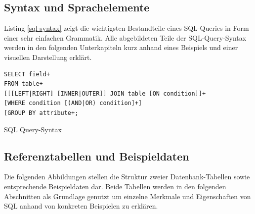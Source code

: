 \documentclass[a4paper]{article}
\begin{document}
\subsection{Syntax und Sprachelemente}
Listing \ref{sql-syntax} zeigt die wichtigsten Bestandteile eines SQL-Queries in Form einer sehr einfachen Grammatik. Alle abgebildeten Teile der SQL-Query-Syntax werden in den folgenden Unterkapiteln kurz anhand eines Beispiels und einer visuellen Darstellung erklärt.

\begin{listing}[H]
\begin{verbatim}
SELECT field+
FROM table+
[[[LEFT|RIGHT] [INNER|OUTER]] JOIN table [ON condition]]+
[WHERE condition [(AND|OR) condition]+]
[GROUP BY attribute+;
\end{verbatim}
\caption{SQL Query-Syntax}
\label{sql-syntax}
\end{listing}

\newpage
\subsection{Referenztabellen und Beispieldaten}
Die folgenden Abbildungen stellen die Struktur zweier Datenbank-Tabellen sowie entsprechende Beispieldaten dar. Beide Tabellen werden in den folgenden Abschnitten als Grundlage genutzt um einzelne Merkmale und Eigenschaften von SQL anhand von konkreten Beispielen zu erklären.

\begin{table}[H]
\centering
{}
\caption{Beispiel-Tabellen}
\label{example}
\end{table}
\end{document}
